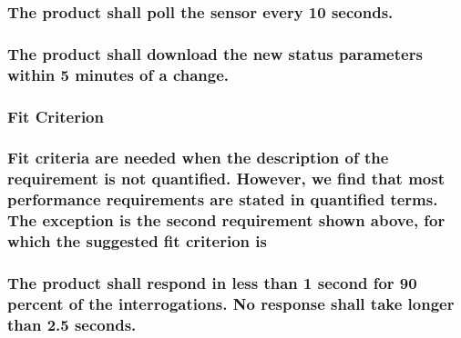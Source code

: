 \documentclass[
]{article}
\begin{document}
\hypertarget{the-product-shall-poll-the-sensor-every-10-seconds.}{%
\subsubsection{The product shall poll the sensor every 10
seconds.}\label{the-product-shall-poll-the-sensor-every-10-seconds.}}

\hypertarget{the-product-shall-download-the-new-status-parameters-within-5-minutes-of-a-change.}{%
\subsubsection{The product shall download the new status parameters
within 5 minutes of a
change.}\label{the-product-shall-download-the-new-status-parameters-within-5-minutes-of-a-change.}}

\hypertarget{fit-criterion-5}{%
\subsubsection{Fit Criterion}\label{fit-criterion-5}}

\hypertarget{fit-criteria-are-needed-when-the-description-of-the-requirement-is-not-quantified.-however-we-find-that-most-performance-requirements-are-stated-in-quantified-terms.-the-exception-is-the-second-requirement-shown-above-for-which-the-suggested-fit-criterion-is}{%
\subsubsection{Fit criteria are needed when the description of the
requirement is not quantified. However, we find that most performance
requirements are stated in quantified terms. The exception is the second
requirement shown above, for which the suggested fit criterion
is}\label{fit-criteria-are-needed-when-the-description-of-the-requirement-is-not-quantified.-however-we-find-that-most-performance-requirements-are-stated-in-quantified-terms.-the-exception-is-the-second-requirement-shown-above-for-which-the-suggested-fit-criterion-is}}

\hypertarget{the-product-shall-respond-in-less-than-1-second-for-90-percent-of-the-interrogations.-no-response-shall-take-longer-than-2.5-seconds.}{%
\subsubsection{\texorpdfstring{The product shall respond in less than 1
second for 90 percent of the interrogations. No response shall take
longer than 2.5 seconds.
}{The product shall respond in less than 1 second for 90 percent of the interrogations. No response shall take longer than 2.5 seconds. }}\label{the-product-shall-respond-in-less-than-1-second-for-90-percent-of-the-interrogations.-no-response-shall-take-longer-than-2.5-seconds.}}
\end{document}
